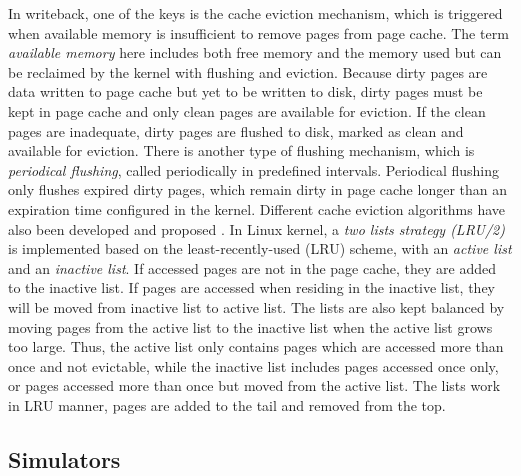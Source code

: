 \documentclass[conference]{IEEEtran}
\begin{document}
            In writeback, one of the keys is the cache eviction mechanism, which is
            triggered when available memory is insufficient to remove pages 
            from page cache. 
            The term \textit{available memory} here includes both free memory and 
            the memory used but can be reclaimed by the kernel with flushing 
            and eviction. 
            Because dirty pages are data written to page cache but yet to be 
            written to disk, dirty pages must be kept in page cache and only clean pages 
            are available for eviction.
            If the clean pages are inadequate, dirty pages are flushed to disk, 
            marked as clean and available for eviction. 
            There is another type of flushing mechanism, which is 
            \textit{periodical flushing}, called periodically in predefined intervals. 
            Periodical flushing only flushes expired dirty pages, which remain dirty in 
            page cache longer than an expiration time configured in the kernel. 
            Different cache eviction algorithms have also been developed and proposed
            \cite{owda2014comparison}.
            In Linux kernel, a \textit{two lists strategy (LRU/2)} is implemented based on 
            the least-recently-used (LRU) scheme, with an \textit{active list} and 
            an \textit{inactive list}. 
            If accessed pages are not in the page cache, they are added to the inactive list. 
            If pages are accessed when residing in the inactive list, they will be moved from 
            inactive list to active list. 
            The lists are also kept balanced by moving pages from the active list
            to the inactive list when the active list grows too large.
            Thus, the active list only contains pages which are accessed more than once 
            and not evictable, while the inactive list includes pages accessed once only, 
            or pages accessed more than once but moved from the active list. 
            The lists work in LRU manner, pages are added to the tail and removed 
            from the top. 
             
        \subsection{Simulators}
            
\end{document}
